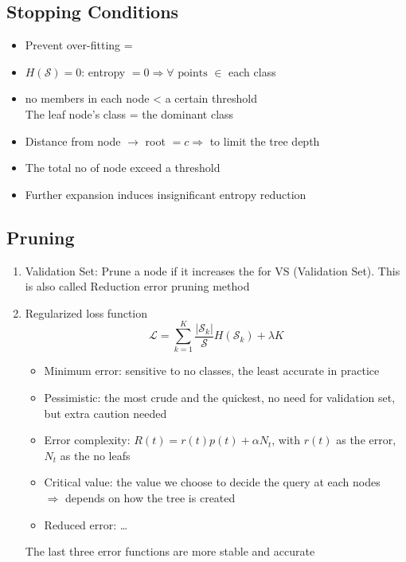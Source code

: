 \subsection{Stopping Conditions}
\begin{itemize}
	\item Prevent over-fitting = 
	\item $H(\mathcal{S}) = 0$: entropy $= 0 \Rightarrow \forall \text{ points } \in$ each class
	\item \ac{no} members in each node < a certain threshold\\
	The leaf node's class = the dominant class
	\item Distance from node $\rightarrow$ root $= c \Rightarrow$ to limit the tree depth
	\item The total \ac{no} of node exceed a threshold
	\item Further expansion induces insignificant entropy reduction
\end{itemize}

\subsection{Pruning}
\begin{enumerate}
	\item Validation Set: Prune a node if it increases the  for VS (Validation Set). This is also called Reduction error pruning method
	\item Regularized loss function
	\begin{equation}
		\mathcal{L} = \sum_{k=1}^{K} \frac{|\mathcal{S}_k|}{\mathcal{S}} H(\mathcal{S}_k) + \lambda K
	\end{equation}
	\begin{itemize}
		\item Minimum error: sensitive to \ac{no} classes, the least accurate in practice
		\item Pessimistic: the most crude and the quickest, no need for validation set, but extra caution needed
		\item Error complexity: $R(t) = r(t) p(t) + \alpha N_t$, with $r(t)$ as the error, $N_t$ as the \ac{no} leafs
		\item Critical value: the value we choose to decide the query at each nodes\\
		$\Rightarrow$ depends on how the tree is created
		\item Reduced error: \dots
	\end{itemize}
	\note The last three error functions are more stable and accurate
\end{enumerate}

